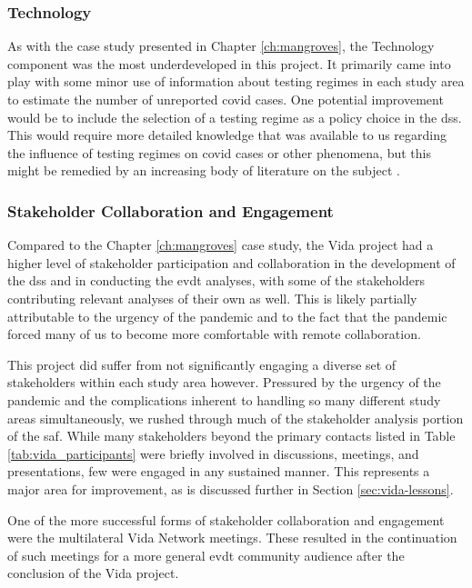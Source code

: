 \subsubsection{Technology}

As with the case study presented in Chapter \ref{ch:mangroves}, the Technology component was the most underdeveloped in this project. It primarily came into play with some minor use of information about testing regimes in each study area to estimate the number of unreported \ac{covid} cases. One potential improvement would be to include the selection of a testing regime as a policy choice in the \ac{dss}. This would require more detailed knowledge that was available to us regarding the influence of testing regimes on \ac{covid} cases or other phenomena, but this might be remedied by an increasing body of literature on the subject \cite{cordesSpatialAnalysisCOVID192020, souchCommentaryRuralUrban2021}.

\subsubsection{Stakeholder Collaboration and Engagement}

Compared to the Chapter \ref{ch:mangroves} case study, the Vida project had a higher level of stakeholder participation and collaboration in the development of the \ac{dss} and in conducting the \ac{evdt} analyses, with some of the stakeholders contributing relevant analyses of their own as well. This is likely partially attributable to the urgency of the pandemic and to the fact that the pandemic forced many of us to become more comfortable with remote collaboration. 

This project did suffer from not significantly engaging a diverse set of stakeholders within each study area however. Pressured by the urgency of the pandemic and the complications inherent to handling so many different study areas simultaneously, we rushed through much of the stakeholder analysis portion of the \ac{saf}. While many stakeholders beyond the primary contacts listed in Table \ref{tab:vida_participants} were briefly involved in discussions, meetings, and presentations, few were engaged in any sustained manner. This represents a major area for improvement, as is discussed further in Section \ref{sec:vida-lessons}.

One of the more successful forms of stakeholder collaboration and engagement were the multilateral Vida Network meetings. These resulted in the continuation of such meetings for a more general \ac{evdt} community audience after the conclusion of the Vida project.

